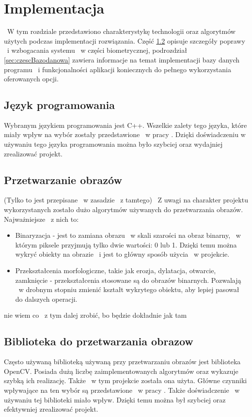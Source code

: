 \chapter{Implementacja}
\label{cha:projekt}
~W tym rozdziale przedstawiono charakterystykę technologii oraz algorytmów użytych podczas implementacji rozwiązania. Część \ref{sec:przetwarzanieObrazow} opisuje szczegóły poprawy ~i wzbogacania systemu ~w części biometrycznej, podrozdział \ref{sec:czescBazodanowa} zawiera informacje na temat implementacji bazy danych programu ~i funkcjonalności aplikacji koniecznych do pełnego wykorzystania oferowanych opcji.

\section{Język programowania}
\label{sec:jezykProgramowania}
Wybranym językiem programowania jest C++. Wszelkie zalety tego języka, które miały wpływ na wybór zostały przedstawione ~w pracy \cite{Gl11}. Dzięki doświadczeniu w używaniu tego języka programowania można było szybciej oraz wydajniej zrealizować projekt.

\section{Przetwarzanie obrazów}
\label{sec:przetwarzanieObrazow}
(Tylko to jest przepisane ~w zasadzie ~z tamtego)
~Z uwagi na charakter projektu wykorzystanych zostało dużo algorytmów używanych do przetwarzania obrazów. Najważniejsze ~z nich to:
\begin{itemize}
\item Binaryzacja - jest to zamiana obrazu ~w skali szarości na obraz binarny, ~w którym piksele przyjmują tylko dwie wartości: 0 lub 1. Dzięki temu można wykryć obiekty na obrazie ~i jest to główny sposób użycia ~w projekcie.
\item Przekształcenia morfologiczne, takie jak erozja, dylatacja, otwarcie, zamknięcie - przekształcenia stosowane są do obrazów binarnych. Pozwalają ~w drobnym stopniu zmienić kształt wykrytego obiektu, aby lepiej pasował do dalszych operacji. 
\end{itemize}

nie wiem co ~z tym dalej zrobić, bo będzie dokładnie jak tam

\section{Biblioteka do przetwarzania obrazow}
\label{sec:bibliotekaObrazow}
Często używaną biblioteką używaną przy przetwarzaniu obrazów jest biblioteka OpenCV. Posiada dużą liczbę zaimplementowanych algorytmów oraz wykazuje szybką ich realizację. Także ~w tym projekcie została ona użyta. Główne czynniki wpływające na ten wybór są przedstawione ~w pracy \cite{Gl11}. Także doświadczenie ~w używaniu tej biblioteki miało wpływ. Dzięki temu można był szybciej oraz efektywniej zrealizować projekt.

